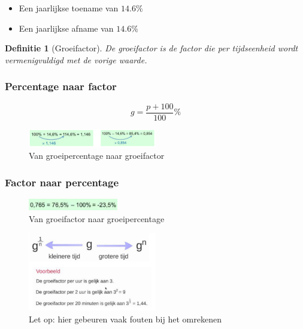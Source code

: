 \documentclass{article}
\newtheorem{theorem}{Definitie}[section]
\begin{document}
\begin{itemize}
    \item Een jaarlijkse toename van $14.6\%$
    \item Een jaarlijkse afname van $14.6\%$
\end{itemize}

\begin{theorem}[Groeifactor]
De groeifactor is de factor die per tijdseenheid wordt vermenigvuldigd met de vorige waarde.
\end{theorem}

\subsubsection{Percentage naar factor}

\begin{equation}
g = \frac{p + 100}{100}\%
\end{equation} 

\begin{figure}[H]
    \centering
    \includegraphics[width=0.5\textwidth]{percentage-naar-factor.png}
    \caption{Van groeipercentage naar groeifactor}
\end{figure}


\subsubsection{Factor naar percentage}

\begin{figure}[H]
    \centering
    \includegraphics[width=0.35\textwidth]{factor-naar-percentage.png}
    \caption{Van groeifactor naar groeipercentage}
\end{figure}

\begin{figure}[H]
    \centering
    \includegraphics[width=0.5\textwidth]{groeifactoren.png}
    \caption{Let op: hier gebeuren vaak fouten bij het omrekenen}
\end{figure}
\end{document}
